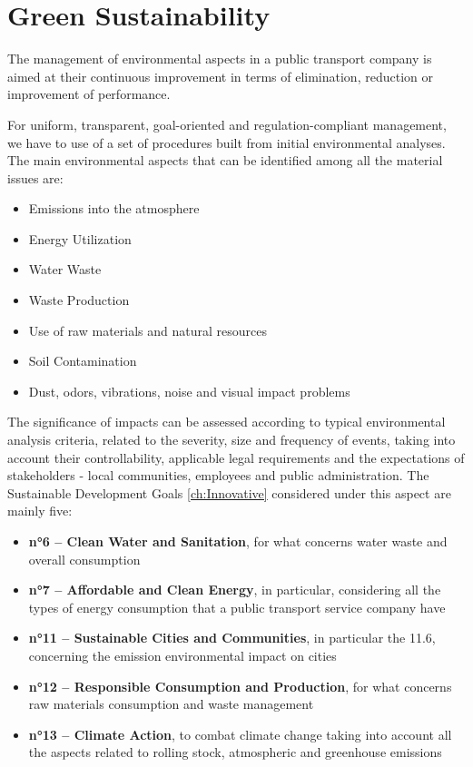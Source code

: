 \newpage
\section{Green Sustainability}
\label{sec:greensus}
The management of environmental aspects in a public transport company is aimed at their continuous improvement in terms of elimination, reduction or improvement of performance.

For uniform, transparent, goal-oriented and regulation-compliant management, we have to use of a set of procedures built from initial environmental analyses. The main environmental aspects that can be identified among all the material issues are:
\begin{itemize}
    \item Emissions into the atmosphere
    \item Energy Utilization
    \item Water Waste
    \item Waste Production
    \item Use of raw materials and natural resources
    \item Soil Contamination
    \item Dust, odors, vibrations, noise and visual impact problems
\end{itemize}

The significance of impacts can be assessed according to typical environmental analysis criteria, related to the severity, size and frequency of events, taking into account their controllability, applicable legal requirements and the expectations of stakeholders - local communities, employees and public administration. 
The Sustainable Development Goals \ref{ch:Innovative} considered under this aspect are mainly five:
\begin{itemize}
    \item \textbf{n°6 – Clean Water and Sanitation}, for what concerns water waste and overall consumption
    \item \textbf{n°7 – Affordable and Clean Energy}, in particular, considering all the types of energy consumption that a public transport service company have
     \item \textbf{n°11 – Sustainable Cities and Communities}, in particular the 11.6, concerning the emission environmental impact on cities
    \item \textbf{n°12 – Responsible Consumption and Production}, for what concerns raw materials consumption and waste management
    \item \textbf{n°13 – Climate Action}, to combat climate change taking into account all the aspects related to rolling stock, atmospheric and greenhouse emissions
\end{itemize}

